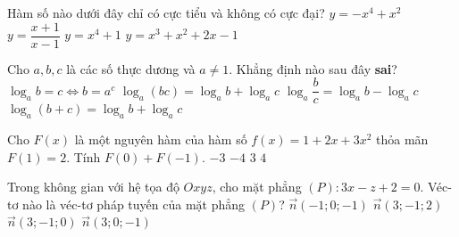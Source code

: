 \begin{ex}%
	Hàm số nào dưới đây chỉ có cực tiểu và không có cực đại?
	\choice
	{$ y=-x^4+x^2 $}
	{$ y=\dfrac{x+1}{x-1} $}
	{\True $ y=x^4+1 $}
	{$ y=x^3+x^2+2x-1 $}
\end{ex}
\begin{ex}%
	Cho $ a,b,c $ là các số thực dương và $ a\ne 1 $. Khẳng định nào sau đây \textbf{sai}?
	\choice
	{${\log _a}b = c \Leftrightarrow b = {a^c}$}
	{${\log _a}(bc) = {\log _a}b + {\log _a}c$}
	{${\log _a}\dfrac{b}{c} = {\log _a}b - {\log _a}c$}
	{\True ${\log _a}(b + c) = {\log _a}b + {\log _a}c$}
\end{ex}
\begin{ex}%
	Cho $F(x)$ là một nguyên hàm của hàm số $f(x)=1+2x+3x^2$ thỏa mãn $F(1)=2$. Tính $F(0)+F(-1)$.
	\choice
	{\True $ -3 $}
	{$ -4 $}
	{$ 3 $}
	{$ 4 $}
	
\end{ex}
\begin{ex}%
	Trong không gian với hệ tọa độ $ Oxyz $, cho mặt phẳng $ (P)\colon 3x-z+2=0 $. Véc-tơ nào là véc-tơ pháp tuyến của mặt phẳng $ (P) $?
	\choice
	{$\overrightarrow n (- 1;0; - 1)$}
	{$\overrightarrow n (3; - 1;2)$}
	{$\overrightarrow n (3; - 1;0)$}
	{\True $\overrightarrow n (3;0; - 1)$}
\end{ex}
